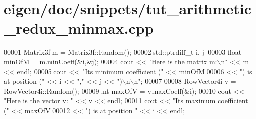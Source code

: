 \hypertarget{eigen_2doc_2snippets_2tut__arithmetic__redux__minmax_8cpp_source}{}\section{eigen/doc/snippets/tut\+\_\+arithmetic\+\_\+redux\+\_\+minmax.cpp}
\label{eigen_2doc_2snippets_2tut__arithmetic__redux__minmax_8cpp_source}

\begin{DoxyCode}
00001   Matrix3f m = Matrix3f::Random();
00002   std::ptrdiff\_t i, j;
00003   \textcolor{keywordtype}{float} minOfM = m.minCoeff(&i,&j);
00004   cout << \textcolor{stringliteral}{"Here is the matrix m:\(\backslash\)n"} << m << endl;
00005   cout << \textcolor{stringliteral}{"Its minimum coefficient ("} << minOfM 
00006        << \textcolor{stringliteral}{") is at position ("} << i << \textcolor{stringliteral}{","} << j << \textcolor{stringliteral}{")\(\backslash\)n\(\backslash\)n"};
00007 
00008   RowVector4i v = RowVector4i::Random();
00009   \textcolor{keywordtype}{int} maxOfV = v.maxCoeff(&i);
00010   cout << \textcolor{stringliteral}{"Here is the vector v: "} << v << endl;
00011   cout << \textcolor{stringliteral}{"Its maximum coefficient ("} << maxOfV 
00012        << \textcolor{stringliteral}{") is at position "} << i << endl;
\end{DoxyCode}
